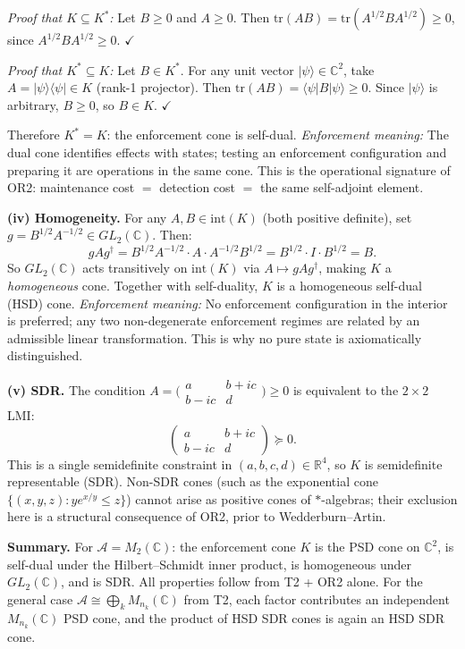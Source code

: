 \documentclass[11pt]{article}
\theoremstyle{remark}
\begin{document}
\textit{Proof that $K \subseteq K^*$:}  Let $B \ge 0$ and $A \ge 0$.  Then $\mathrm{tr}(AB) = \mathrm{tr}(A^{1/2}BA^{1/2}) \ge 0$, since $A^{1/2}BA^{1/2} \ge 0$.  \hfill$\checkmark$

\textit{Proof that $K^* \subseteq K$:}  Let $B \in K^*$.  For any unit vector $|\psi\rangle \in \mathbb{C}^2$, take $A = |\psi\rangle\langle\psi| \in K$ (rank-1 projector).  Then $\mathrm{tr}(AB) = \langle\psi|B|\psi\rangle \ge 0$.  Since $|\psi\rangle$ is arbitrary, $B \ge 0$, so $B \in K$. \hfill$\checkmark$

Therefore $K^* = K$: the enforcement cone is self-dual.  \textit{Enforcement meaning:} The dual cone identifies effects with states; testing an enforcement configuration and preparing it are operations in the same cone.  This is the operational signature of OR2: maintenance cost $=$ detection cost $=$ the same self-adjoint element.

\smallskip\noindent\textbf{(iv) Homogeneity.}  For any $A, B \in \mathrm{int}(K)$ (both positive definite), set $g = B^{1/2}A^{-1/2} \in GL_2(\mathbb{C})$.  Then:
\[
g A g^\dagger = B^{1/2}A^{-1/2}\cdot A\cdot A^{-1/2}B^{1/2} = B^{1/2}\cdot I\cdot B^{1/2} = B.
\]
So $GL_2(\mathbb{C})$ acts transitively on $\mathrm{int}(K)$ via $A \mapsto gAg^\dagger$, making $K$ a \emph{homogeneous} cone.  Together with self-duality, $K$ is a homogeneous self-dual (HSD) cone.  \textit{Enforcement meaning:} No enforcement configuration in the interior is preferred; any two non-degenerate enforcement regimes are related by an admissible linear transformation.  This is why no pure state is axiomatically distinguished.

\smallskip\noindent\textbf{(v) SDR.}  The condition $A = \bigl(\begin{smallmatrix}a & b+ic \\ b-ic & d\end{smallmatrix}\bigr) \ge 0$ is equivalent to the $2 \times 2$ LMI:
\[
\begin{pmatrix} a & b+ic \\ b-ic & d \end{pmatrix} \succeq 0.
\]
This is a single semidefinite constraint in $(a,b,c,d) \in \mathbb{R}^4$, so $K$ is semidefinite representable (SDR).  Non-SDR cones (such as the exponential cone $\{(x,y,z): ye^{x/y} \le z\}$) cannot arise as positive cones of $*$-algebras; their exclusion here is a structural consequence of OR2, prior to Wedderburn--Artin.

\smallskip\noindent\textbf{Summary.}  For $\mathcal{A} = M_2(\mathbb{C})$: the enforcement cone $K$ is the PSD cone on $\mathbb{C}^2$, is self-dual under the Hilbert--Schmidt inner product, is homogeneous under $GL_2(\mathbb{C})$, and is SDR.  All properties follow from T2 + OR2 alone.  For the general case $\mathcal{A} \cong \bigoplus_k M_{n_k}(\mathbb{C})$ from T2, each factor contributes an independent $M_{n_k}(\mathbb{C})$ PSD cone, and the product of HSD SDR cones is again an HSD SDR cone.
\end{document}

